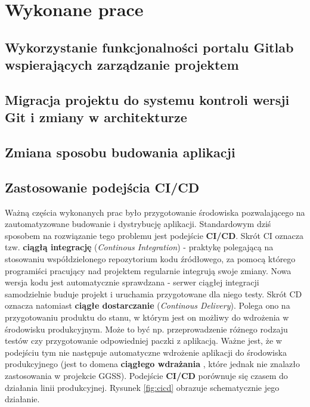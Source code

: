 \chapter{Wykonane prace}
\label{cha:prace}

\section{Wykorzystanie funkcjonalności portalu Gitlab wspierających zarządzanie projektem}

\newpage
\section{Migracja projektu do systemu kontroli wersji Git i zmiany w architekturze}



\section{Zmiana sposobu budowania aplikacji} \label{buildingNew}

\newpage
\section{Zastosowanie podejścia CI/CD}
Ważną częścia wykonanych prac było przygotowanie środowiska pozwalającego na zautomatyzowane budowanie i dystrybucję aplikacji. Standardowym dziś sposobem na rozwiązanie tego problemu jest podejście \textbf{CI/CD}. Skrót CI oznacza tzw. \textbf{ciągłą integrację} (\textit{Continous Integration}) - praktykę polegającą na stosowaniu współdzielonego repozytorium kodu źródłowego, za pomocą którego programiści pracujący nad projektem regularnie integrują swoje zmiany. Nowa wersja kodu jest automatycznie sprawdzana - serwer ciągłej integracji samodzielnie buduje projekt i uruchamia przygotowane dla niego testy. Skrót CD oznacza natomiast \textbf{ciągłe dostarczanie} (\textit{Continous Delivery}). Polega ono na przygotowaniu produktu do stanu, w którym jest on możliwy do wdrożenia w środowisku produkcyjnym. Może to być np. przeprowadzenie różnego rodzaju testów czy przygotowanie odpowiedniej paczki z aplikacją. Ważne jest, że w podejściu tym nie następuje automatyczne wdrożenie aplikacji do środowiska produkcyjnego (jest to domena \textbf{ciągłego wdrażania} \cite{CICDDef}, które jednak nie znalazło zastosowania w projekcie GGSS). Podejście \textbf{CI/CD} porównuje się czasem do działania linii produkcyjnej. Rysunek \ref{fig:cicd} obrazuje schematycznie jego działanie. 

